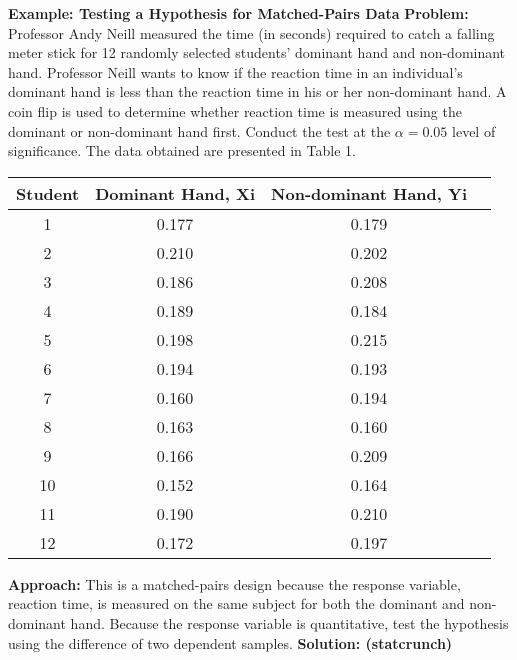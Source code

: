 \documentclass{report}
\begin{document}
    \pagebreak \bigbreak \noindent 
    \begin{mdframed}
      \textbf{Example: Testing a Hypothesis for Matched-Pairs Data}
      \bigbreak \noindent 
      \textbf{Problem:}
      Professor Andy Neill measured the time (in seconds) required to catch a falling meter stick for 12 randomly selected students' dominant hand and non-dominant hand. Professor Neill wants to know if the reaction time in an individual's dominant hand is less than the reaction time in his or her non-dominant hand. A coin flip is used to determine whether reaction time is measured using the dominant or non-dominant hand first. Conduct the test at the $\alpha = 0.05$ level of significance. The data obtained are presented in Table 1.
      \bigbreak \noindent 
      \begin{center}
            \begin{tabular}{|c|c|c|c|}
                \hline
                \textbf{Student} & \textbf{Dominant Hand, Xi} & \textbf{Non-dominant Hand, Yi} \\
                \hline
                1 & 0.177 & 0.179 \\
                2 & 0.210 & 0.202 \\
                3 & 0.186 & 0.208 \\
                4 & 0.189 & 0.184 \\
                5 & 0.198 & 0.215 \\
                6 & 0.194 & 0.193 \\
                7 & 0.160 & 0.194 \\
                8 & 0.163 & 0.160 \\
                9 & 0.166 & 0.209 \\
                10 & 0.152 & 0.164 \\
                11 & 0.190 & 0.210 \\
                12 & 0.172 & 0.197 \\
                \hline
            \end{tabular}
        \end{center}
        \bigbreak \noindent 
      \textbf{Approach:}
      This is a matched-pairs design because the response variable, reaction time, is measured on the same subject for both the dominant and non-dominant hand. Because the response variable is quantitative, test the hypothesis using the difference of two dependent samples.
      \bigbreak \noindent 
      \textbf{Solution: (statcrunch)}
      \bigbreak \noindent 

\end{mdframed}
\end{document}

